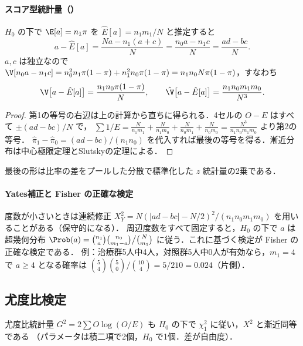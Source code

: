 \paragraph{スコア型統計量（）}
$H_0$ の下で $\E[a]=n_1\pi$ を $\hat E[a]=n_1m_1/N$ と推定すると
\[
a-\hat E[a]=\frac{Na-n_1(a+c)}{N}=\frac{n_0a-n_1c}{N}=\frac{ad-bc}{N}.
\]
$a,c$ は独立なので $\V[n_0a-n_1c]=n_0^2n_1\pi(1-\pi)+n_1^2n_0\pi(1-\pi)=n_1n_0N\pi(1-\pi)$，すなわち
\[
\V\bigl[a-\hat E[a]\bigr]=\frac{n_1n_0\pi(1-\pi)}{N},\qquad
\hat\V\bigl[a-\hat E[a]\bigr]=\frac{n_1n_0m_1m_0}{N^3}.
\]
\begin{proof}
第1の等号の右辺は上の計算から直ちに得られる．4セルの $O-E$ はすべて $\pm(ad-bc)/N$ で，
$\sum 1/E=\frac{N}{n_1m_1}+\frac{N}{n_1m_0}+\frac{N}{n_0m_1}+\frac{N}{n_0m_0}=\frac{N^3}{n_1n_0m_1m_0}$ より第2の等号．
$\hat\pi_1-\hat\pi_0=(ad-bc)/(n_1n_0)$ を代入すれば最後の等号を得る．漸近分布は中心極限定理とSlutskyの定理による．
\end{proof}
最後の形は比率の差をプールした分散で標準化した $z$ 統計量の2乗である．

\paragraph{Yates補正と Fisher の正確な検定}
度数が小さいときは連続修正 $X^2_Y=N(|ad-bc|-N/2)^2/(n_1n_0m_1m_0)$ を用いることがある（保守的になる）．
周辺度数をすべて固定すると，$H_0$ の下で $a$ は超幾何分布
$\Prob(a)=\binom{n_1}{a}\binom{n_0}{m_1-a}\big/\binom{N}{m_1}$ に従う．これに基づく検定が Fisher の正確な検定である．
例：治療群5人中4人，対照群5人中0人が有効なら，$m_1=4$ で $a\ge4$ となる確率は
$\binom54\binom50/\binom{10}{4}=5/210=0.024$（片側）．

\subsection{尤度比検定}\label{subsec:04-lrt}
尤度比統計量 $G^2=2\sum O\log(O/E)$ も $H_0$ の下で $\chi^2_1$ に従い，$X^2$ と漸近同等である
（パラメータは積二項で2個，$H_0$ で1個．差が自由度）．

